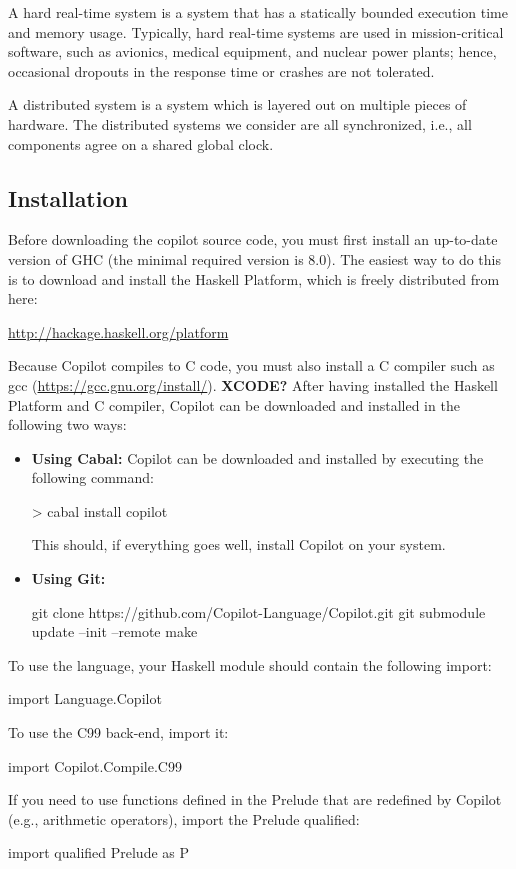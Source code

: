 A hard real-time system is a system that has a statically bounded execution time
and memory usage.  Typically, hard real-time systems are used in
mission-critical software, such as avionics, medical equipment, and nuclear power
plants; hence, occasional dropouts in the response time or crashes are not
tolerated.

A distributed system is a system which is layered out on multiple pieces of hardware.
The distributed systems we consider are all synchronized, i.e., all components agree on
a shared global clock.


\subsection{Installation} \label{sec:install}

Before downloading the copilot source code, you must first install an
up-to-date version of GHC (the minimal required version is 8.0).
The easiest way to do this is to download and install the Haskell Platform,
which is freely distributed from here:

\begin{center}
\url{http://hackage.haskell.org/platform}
\end{center}

\noindent Because Copilot compiles to C code, you must also install a C compiler such as gcc (\url{https://gcc.gnu.org/install/}).  \textbf{XCODE?} After having installed the Haskell Platform and C compiler, Copilot can be downloaded and
installed in the following two ways:

\begin{itemize}
\item \textbf{Using Cabal: } Copilot can be downloaded and installed by executing the following command:

\begin{code}
> cabal install copilot
\end{code}

\noindent This should, if everything goes well, install Copilot on your system.

\item \textbf{Using Git: }

\begin{code}
     git clone https://github.com/Copilot-Language/Copilot.git
     git submodule update --init --remote
     make
\end{code}
\end{itemize}

\noindent To use the language, your Haskell module should contain the following import:
%
\begin{code}
import Language.Copilot
\end{code}
%
To use the C99 back-end, import it:
%
\begin{code}
import Copilot.Compile.C99
\end{code}
%
If you need to use functions defined in the Prelude that are redefined by
Copilot (e.g., arithmetic operators), import the Prelude qualified:
%
\begin{code}
import qualified Prelude as P
\end{code}

